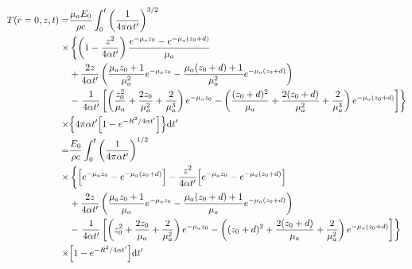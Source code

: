 \documentclass[]{article}
\begin{document}
\begin{align}
  \label{eq:flattop_temp_approx}
  T(r=0, z,t) =& \frac{\mu_a E_0}{\rho c} \int_0^t \qty(\frac{1}{4\pi \alpha t'})^{3/2}  \nonumber \\
  \times & \left\{\left(1 -  \frac{z^2}{4\alpha t'}\right)\frac{e^{-\mu_a z_0} - e^{-\mu_a (z_0+d)}}{\mu_a} \right.\nonumber \\
    &+ \frac{2z}{4\alpha t'} \left( \frac{\mu_a z_0 + 1}{\mu_a^2}e^{-\mu_a z_0} - \frac{\mu_a (z_0+d) + 1}{\mu_a^2}e^{-\mu_a (z_0+d)}\right) \nonumber \\
    &- \left.\frac{1}{4\alpha t'}\left[
   \left( \frac{z_0^2}{\mu_a} + \frac{2z_0}{\mu_a^2} + \frac{2}{\mu_a^3} \right)e^{-\mu_a z_0} -
   \left( \frac{(z_0 + d)^2}{\mu_a} + \frac{2(z_0 + d)}{\mu_a^2} + \frac{2}{\mu_a^3} \right)e^{-\mu_a (z_0+d)}
 \right]
\right\} \nonumber \\
  \times & \qty{4\pi \alpha t' \qty[1 - e^{-R^2/4\alpha t'}] }
  \dd t' \\
  =&
  \frac{E_0}{\rho c} \int_0^t \qty(\frac{1}{4\pi \alpha t'})^{1/2}  \nonumber \nonumber \\
  \times & \left\{\qty[e^{-\mu_a z_0} - e^{-\mu_a (z_0+d)}]   -  \frac{z^2}{4\alpha t'}\qty[e^{-\mu_a z_0} - e^{-\mu_a (z_0+d)}]\right. \nonumber \\
    &+ \frac{2z}{4\alpha t'} \left( \frac{\mu_a z_0 + 1}{\mu_a}e^{-\mu_a z_0} - \frac{\mu_a (z_0+d) + 1}{\mu_a}e^{-\mu_a (z_0+d)}\right) \nonumber \\
    &- \left.\frac{1}{4\alpha t'}\left[
   \left( z_0^2       + \frac{2z_0}{\mu_a} + \frac{2}{\mu_a^2} \right)e^{-\mu_a z_0} -
   \left( (z_0 + d)^2 + \frac{2(z_0 + d)}{\mu_a} + \frac{2}{\mu_a^2} \right)e^{-\mu_a (z_0+d)}
 \right]
\right\} \nonumber \\
  \times & \qty[1 - e^{-R^2/4\alpha t'}]
  \dd t'
\end{align}
\end{document}
